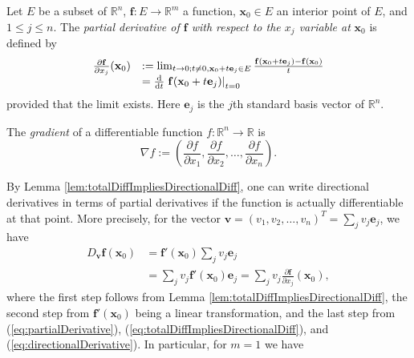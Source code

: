 \begin{defn}
  \label{def:partialDerivative}
  Let $E$ be a subset of $\mathbb{R}^n$,
  $\mathbf{f}: E\rightarrow \mathbb{R}^m$ a function,
  $\mathbf{x}_0\in E$ an interior point of $E$,
  and $1\le j \le n$.
  The \emph{partial derivative of $\mathbf{f}$ with respect to
    the $x_{j}$ variable at} $\mathbf{x}_0$ is defined by
  \begin{equation}
    \label{eq:partialDerivative}
    \begin{array}{ll}
      \frac{\partial \mathbf{f}}{\partial x_j}(\mathbf{x}_0)
      &:=
    \lim_{t\rightarrow0;t\neq 0,\mathbf{x}_0+t\mathbf{e}_j\in E} 
      \frac{\mathbf{f}(\mathbf{x}_0+t\mathbf{e}_j) 
      -\mathbf{f}(\mathbf{x}_0)}{t}\\
      &= \frac{\mathrm{d}}{\mathrm{d} t}
        \left. \mathbf{f}(\mathbf{x}_0+t\mathbf{e}_j)\right|_{t=0}
    \end{array}
  \end{equation}
  provided that the limit exists.
  Here $\mathbf{e}_j$ is the $j$th standard basis vector of
  $\mathbb{R}^n$.
\end{defn}

\begin{defn}
  \label{def:gradient}
  The \emph{gradient} of a differentiable function
  $f: \mathbb{R}^n\rightarrow \mathbb{R}$ is
  \begin{equation}
    \label{eq:gradient}
    \nabla f := \left(
      \frac{\partial f}{\partial x_1}, 
      \frac{\partial f}{\partial x_2}, 
      \ldots,
      \frac{\partial f}{\partial x_n}
      \right).
  \end{equation}  
\end{defn}

\begin{rem}
  \label{rem:directionalDerivativeToPartialDerivative}
  By Lemma \ref{lem:totalDiffImpliesDirectionalDiff},
  one can write directional derivatives
  in terms of partial derivatives
  if the function is actually differentiable at that point.
  More precisely, for the vector
  $\mathbf{v}=(v_1, v_2, \ldots, v_n)^T=\sum_j v_j \mathbf{e}_j$,
  we have
  \begin{align*}
    D_{\mathbf{v}} \mathbf{f}(\mathbf{x}_0)
    &= \mathbf{f}'(\mathbf{x}_0) \sum_j v_j \mathbf{e}_j\\
    &= \sum_j v_j
      \mathbf{f}'(\mathbf{x}_0) \mathbf{e}_j
      = \sum_j v_j
      \frac{\partial \mathbf{f}}{\partial x_j}(\mathbf{x}_0), 
  \end{align*}
  where the first step follows from Lemma
  \ref{lem:totalDiffImpliesDirectionalDiff},
  the second step from $\mathbf{f}'(\mathbf{x}_0)$
  being a linear transformation,
  and the last step from (\ref{eq:partialDerivative}),
  (\ref{eq:totalDiffImpliesDirectionalDiff}), and
  (\ref{eq:directionalDerivative}).
  In particular, for $m=1$ we have
\end{rem}

